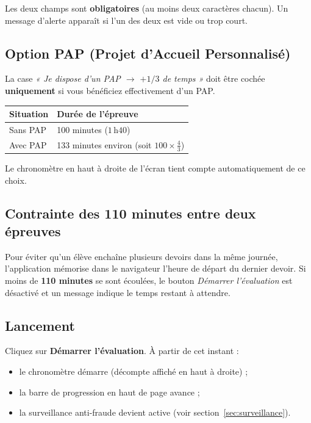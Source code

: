 \documentclass[11pt,a4paper]{article}
\begin{document}
\begin{attention}
Les deux champs sont \textbf{obligatoires} (au moins deux caractères chacun).
Un message d'alerte apparaît si l'un des deux est vide ou trop court.
\end{attention}

\subsection{Option PAP (Projet d'Accueil Personnalisé)}

La case \emph{« Je dispose d'un PAP \(\rightarrow\) \(+1/3\) de temps »} doit être
cochée \textbf{uniquement} si vous bénéficiez effectivement d'un PAP.

\begin{center}
\begin{tabular}{ll}
\toprule
\textbf{Situation} & \textbf{Durée de l'épreuve} \\
\midrule
Sans PAP  & 100 minutes (\(1\,\)h\(40\)) \\
Avec PAP  & 133 minutes environ (soit \(100 \times \tfrac{4}{3}\)) \\
\bottomrule
\end{tabular}
\end{center}

Le chronomètre en haut à droite de l'écran tient compte automatiquement de ce choix.

\subsection{Contrainte des 110 minutes entre deux épreuves}

Pour éviter qu'un élève enchaîne plusieurs devoirs dans la même journée, l'application
mémorise dans le navigateur l'heure de départ du dernier devoir. Si moins de
\textbf{110 minutes} se sont écoulées, le bouton \emph{Démarrer l'évaluation} est
désactivé et un message indique le temps restant à attendre.

\subsection{Lancement}

Cliquez sur \textbf{Démarrer l'évaluation}. À partir de cet instant :
\begin{itemize}
  \item le chronomètre démarre (décompte affiché en haut à droite) ;
  \item la barre de progression en haut de page avance ;
  \item la surveillance anti-fraude devient active (voir section~\ref{sec:surveillance}).
\end{itemize}
\end{document}
